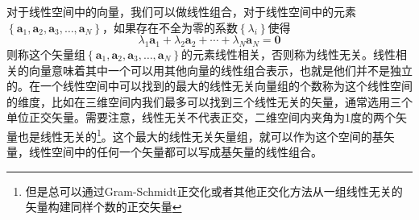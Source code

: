 \documentclass[12pt,a4paper,openany,twoside]{book}
\numberwithin{equation}{section}
\begin{document}
    对于线性空间中的向量，我们可以做线性组合，对于线性空间中的元素$\left\{\mathbf{a}_1,\mathbf{a}_2,\mathbf{a}_3,\dots,\mathbf{a}_N\right\}$，如果存在不全为零的系数$\left\{\lambda_i\right\}$使得
    \begin{equation}
      \lambda_1\mathbf{a}_1+\lambda_2\mathbf{a}_2+\cdots+\lambda_N\mathbf{a}_N=\mathbf{0}
    \end{equation}
    则称这个矢量组$\left\{\mathbf{a}_1,\mathbf{a}_2,\mathbf{a}_3,\dots,\mathbf{a}_N\right\}$的元素线性相关，否则称为线性无关。线性相关的向量意味着其中一个可以用其他向量的线性组合表示，也就是他们并不是独立的。在一个线性空间中可以找到的最大的线性无关向量组的个数称为这个线性空间的维度，比如在三维空间内我们最多可以找到三个线性无关的矢量，通常选用三个单位正交矢量。需要注意，线性无关不代表正交，二维空间内夹角为1度的两个矢量也是线性无关的\footnote{但是总可以通过Gram-Schmidt正交化或者其他正交化方法从一组线性无关的矢量构建同样个数的正交矢量}。这个最大的线性无关矢量组，就可以作为这个空间的基矢量，线性空间中的任何一个矢量都可以写成基矢量的线性组合。
    
\end{document}
